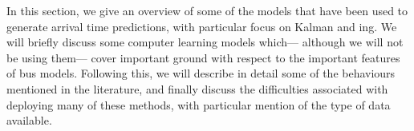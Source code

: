 In this section, we give an overview of some of the models that have been used
to generate \rt{} arrival time predictions,
with particular focus on Kalman and \pf{}ing.
We will briefly discuss some computer learning models which---%
although we will not be using them---%
cover important ground with respect to the important features of bus models.
Following this, we will describe in detail some of the
behaviours mentioned in the literature,
and finally discuss the difficulties associated with deploying many of these methods,
with particular mention of the type of data available.





